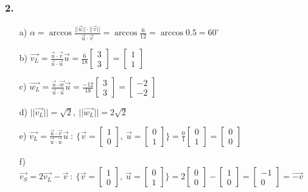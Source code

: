 \documentclass{article}
\begin{document}
\subsubsection*{2.}
\begin{itemize}
\item[a) ] $\alpha = \arccos{\frac{||\vec{u}|| \cdot ||\vec{v}||}{\vec{u} \cdot \vec{v}}} = \arccos{\frac{6}{12}}=\arccos{0.5}=60^{\circ}$ 
\item[b) ] $\vec{v_{L}}=\frac{\vec{u}\cdot\vec{v}}{\vec{u}\cdot\vec{u}}\vec{u}=\frac{6}{18}\begin{bmatrix}3 \\ 3 \end{bmatrix}= \begin{bmatrix}1 \\ 1 \end{bmatrix}$
\item[c) ] $\vec{w_{L}}=\frac{\vec{u}\cdot\vec{w}}{\vec{u}\cdot\vec{u}}\vec{u}=\frac{-12}{18}\begin{bmatrix}3 \\ 3 \end{bmatrix}= \begin{bmatrix}-2 \\ -2 \end{bmatrix}$
\item[d) ] $||\vec{v_{L}}||= \sqrt{2},\ ||\vec{w_{L}}||=2\sqrt{2} $
\item[e) ] $\vec{v_{L}}=\frac{\vec{u}\cdot\vec{v}}{\vec{u}\cdot\vec{u}}\vec{u}\ :\ \{ \vec{v}=\begin{bmatrix}1 \\ 0 \end{bmatrix},\ \vec{u}=\begin{bmatrix}0 \\ 1 \end{bmatrix}\} =\frac{0}{1}\begin{bmatrix}0 \\ 1 \end{bmatrix}= \begin{bmatrix}0 \\ 0 \end{bmatrix}$
\item[f) ] $\vec{v_{S}}=2\vec{v_{L}}-\vec{v}\ :\ \{ \vec{v}=\begin{bmatrix}1 \\ 0 \end{bmatrix},\ \vec{u}=\begin{bmatrix}0 \\ 1 \end{bmatrix} \} = 2\begin{bmatrix}0 \\ 0 \end{bmatrix}- \begin{bmatrix}1 \\ 0 \end{bmatrix}= \begin{bmatrix}-1 \\ 0 \end{bmatrix}= \vec{-v}$
\end{itemize}   
\end{document}
